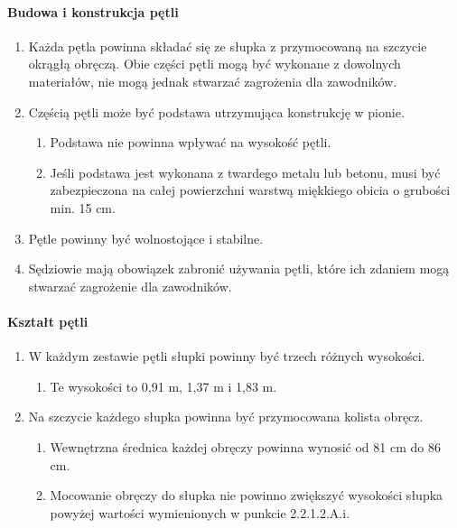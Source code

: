 \documentclass[12pt]{article}
\begin{document}
\paragraph{Budowa i konstrukcja pętli}
\begin{enumerate}
	\item Każda pętla powinna składać się ze słupka z przymocowaną na szczycie
	      okrągłą obręczą. Obie części pętli mogą być wykonane z dowolnych
	      materiałów, nie mogą jednak stwarzać zagrożenia dla zawodników.

	\item Częścią pętli może być podstawa utrzymująca konstrukcję w pionie.
	      \begin{enumerate}
		      \item Podstawa nie powinna wpływać na wysokość pętli.

		      \item Jeśli podstawa jest wykonana z twardego metalu lub betonu, musi być
		            zabezpieczona na całej powierzchni warstwą miękkiego obicia o grubości
		            min. 15 cm.
	      \end{enumerate}

	\item Pętle powinny być wolnostojące i stabilne.

	\item Sędziowie mają obowiązek zabronić używania pętli, które ich zdaniem
	      mogą stwarzać zagrożenie dla zawodników.
\end{enumerate}

\paragraph{Kształt pętli}
\begin{enumerate}
	\item W każdym zestawie pętli słupki powinny być trzech różnych wysokości.
	      \begin{enumerate}
		      \item Te wysokości to 0,91 m, 1,37 m i 1,83 m.
	      \end{enumerate}
	\item Na szczycie każdego słupka powinna być przymocowana kolista obręcz.
	      \begin{enumerate}
		      \item Wewnętrzna średnica każdej obręczy powinna wynosić od 81 cm do 86 cm.

		      \item Mocowanie obręczy do słupka nie powinno zwiększyć wysokości słupka
		            powyżej wartości wymienionych w punkcie 2.2.1.2.A.i.
	      \end{enumerate}
\end{enumerate}
\end{document}
